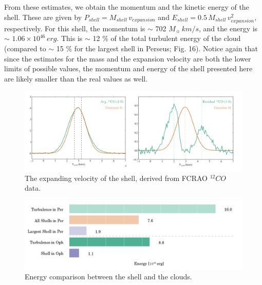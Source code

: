 \documentclass[11pt,a4paper]{emulateapj}
\begin{document}
From these estimates, we obtain the momentum and the kinetic energy of the shell. These are given by $P_{shell} = M_{shell}\,v_{expansion}$ and $E_{shell} = 0.5\,M_{shell}\,v^2_{expansion}$, respectively. For this shell, the momentum is $\sim$ 702 $M_{\sun}\,km/s$, and the energy is $\sim$ $1.06\times10^{46}\,erg$. This is $\sim$ 12 \% of the total turbulent energy of the cloud (compared to $\sim$ 15 \% for the largest shell in Perseus; Fig. 16). Notice again that since the estimates for the mass and the expansion velocity are both the lower limits of possible values, the momentum and energy of the shell presented here are likely smaller than the real values as well.

\begin{figure}[ht]
\centering
\includegraphics[scale=0.5]{fig/v_exp}
\caption{The expanding velocity of the shell, derived from FCRAO $^{12}CO$ data.
}
\end{figure}

\begin{figure}[hb]
\centering
\includegraphics[scale=0.35]{fig/bar_energy.png}
\caption{Energy comparison between the shell and the clouds.
}
\end{figure}
\end{document}
